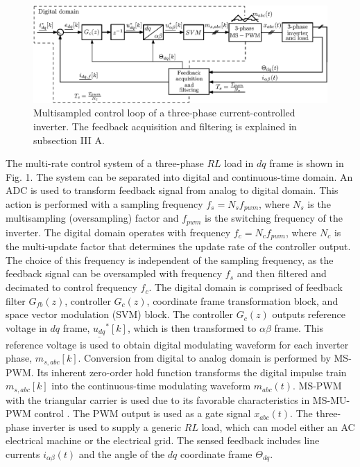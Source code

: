 \documentclass[conference]{IEEEtran}
\begin{document}
\begin{figure}[t!]
    \centerline{\includegraphics[width=0.8\linewidth]{figures/schematic.eps}}
    \caption{Multisampled control loop of a three-phase current-controlled inverter. The feedback acquisition and filtering is explained in subsection III A.}
    \label{fig:MSControl}
\end{figure}

The multi-rate control system of a three-phase $RL$ load in $dq$ frame is shown in Fig. 1. The system can be separated into digital and continuous-time domain. An ADC is used to transform feedback signal from analog to digital domain. This action is performed with a sampling frequency $f_s = N_s f_{pwm}$, where $N_s$ is the multisampling (oversampling) factor and $f_{pwm}$ is the switching frequency of the inverter. The digital domain operates with frequency $f_c = N_c f_{pwm}$, where $N_c$ is the multi-update factor that determines the update rate of the controller output. The choice of this frequency is independent of the sampling frequency, as the feedback signal can be oversampled with frequency $f_s$ and then filtered and decimated to control frequency $f_c$. The digital domain is comprised of feedback filter $G_{fb}(z)$, controller $G_c(z)$, coordinate frame transformation block, and space vector modulation (SVM) block. The controller $G_c(z)$ outputs reference voltage in $dq$ frame, $\underline{u_{dq}}^*[k]$, which is then transformed to $\alpha \beta$ frame. This reference voltage is used to obtain digital modulating waveform for each inverter phase, $m_{s,abc}[k]$. Conversion from digital to analog domain is performed by MS-PWM. Its inherent zero-order hold function transforms the digital impulse train $m_{s,abc}[k]$ into the continuous-time modulating waveform $m_{abc}(t)$. MS-PWM with the triangular carrier is used due to its favorable characteristics in MS-MU-PWM control \cite{corradini2018}. The PWM output is used as a gate signal $x_{abc}(t)$. The three-phase inverter is used to supply a generic $RL$ load, which can model either an AC electrical machine or the electrical grid. The sensed feedback includes line currents $i_{\alpha \beta}(t)$ and the angle of the $dq$ coordinate frame $\Theta_{dq}$. 
\end{document}
